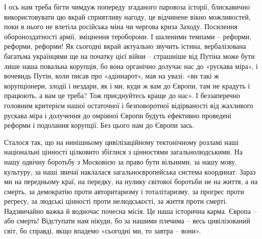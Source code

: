 І ось нам треба бігти чимдуж попереду згаданого паровоза історії, блискавично
використовувати цю вкрай сприятливу нагоду, це відчинене вікно можливостей,
поки в нього не влетіла російська міна чи чергова криза Заходу. Посилення
обороноздатності армії, зміцнення тероборони. І шаленими темпами – реформи,
реформи, реформи! Як сьогодні вкрай актуально звучить істина, вербалізована
багатьма українцями ще на початку цієї війни – страшніше від Путіна може бути
лише наша повальна корупція, бо вона органічно долучає нас до «рускава міра», і
вочевидь Путін, коли писав про «адіннарот», мав на увазі: «ви такі ж
корупціонери, злодії і нездари, як і ми, куди ж вам до Європи, там не крадуть і
працюють, а вам це треба? Тож приєднуйтесь краще до нас». І беззаперечно
головним критерієм нашої остаточної і безповоротної відірваності від жахливого
рускава міра і долучення до омріяної Європи будуть ефективно проведені реформи
і подолання корупції. Без цього нам до Європи зась.


Сталося так, що на нинішньому цивілізаційному тектонічному розламі наші
національні цінності цілковито збіглися з цінностями загальнолюдськими. На нашу
одвічну боротьбу з Московією за право бути вільними, за нашу мову, культуру, за
наші звичаї наклалася загальноєвропейська система координат. Зараз ми на
передньому краї, на передку, на нулику світової боротьби не на життя, а на
смерть, за демократію проти авторитаризму і тоталітаризму, за прогрес проти
регресу, за людські цінності проти нелюдськості, за життя проти смерті.
Надзвичайно важка й водночас почесна місія. Це наша історична карма. Європа –
або смерть! Відступати нам нікуди, бо за нашими плечима – весь цивілізований
світ, бо справді, якщо впадемо «сьогодні ми, то завтра – вони». 
